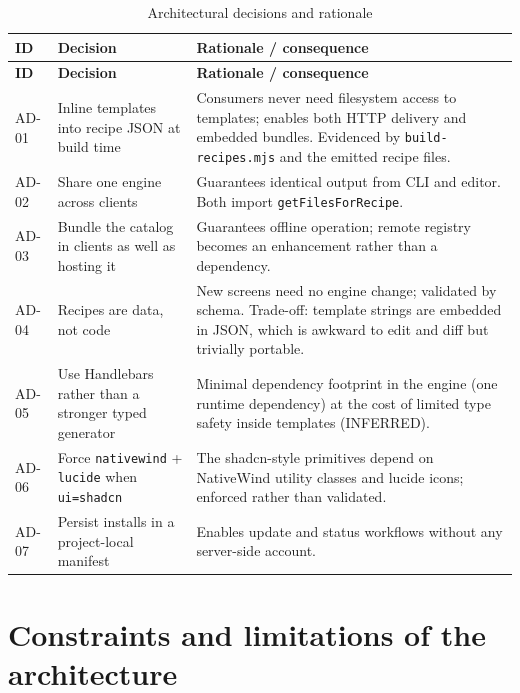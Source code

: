 \begin{longtable}{@{}L{1.3cm}L{5.4cm}L{7.3cm}@{}}
\caption{Architectural decisions and rationale}\\
\toprule
\textbf{ID} & \textbf{Decision} & \textbf{Rationale / consequence} \\
\midrule
\endfirsthead
\toprule
\textbf{ID} & \textbf{Decision} & \textbf{Rationale / consequence} \\
\midrule
\endhead
AD-01 & Inline templates into recipe JSON at build time & Consumers never need
filesystem access to templates; enables both HTTP delivery and embedded bundles.
Evidenced by \texttt{build-recipes.mjs} and the emitted recipe files. \\
AD-02 & Share one engine across clients & Guarantees identical output from CLI and
editor. Both import \texttt{getFilesForRecipe}. \\
AD-03 & Bundle the catalog in clients as well as hosting it & Guarantees offline
operation; remote registry becomes an enhancement rather than a dependency. \\
AD-04 & Recipes are data, not code & New screens need no engine change; validated by
schema. Trade-off: template strings are embedded in JSON, which is awkward to edit
and diff but trivially portable. \\
AD-05 & Use Handlebars rather than a stronger typed generator & Minimal dependency
footprint in the engine (one runtime dependency) at the cost of limited type safety
inside templates (INFERRED). \\
AD-06 & Force \texttt{nativewind} + \texttt{lucide} when \texttt{ui=shadcn} & The
shadcn-style primitives depend on NativeWind utility classes and lucide icons;
enforced rather than validated. \\
AD-07 & Persist installs in a project-local manifest & Enables update and status
workflows without any server-side account. \\
\bottomrule
\end{longtable}

\section{Constraints and limitations of the architecture}

